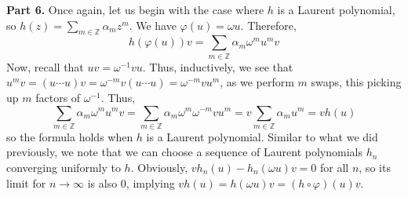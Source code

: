 \documentclass[aps,pra,showpacs,notitlepage,onecolumn,superscriptaddress,nofootinbib]{revtex4-1}
\theoremstyle{definition}
\begin{document}
    \noindent \textbf{Part 6.} Once again, let us begin with the case where $h$ is a Laurent polynomial, so $h(z) = \sum_{m \in \mathbb{Z}} \alpha_m z^{m}$. We have $\varphi(u) = \omega u$. Therefore,
    \begin{equation}
      h(\varphi(u)) v = \displaystyle\sum_{m \in \mathbb{Z}} \alpha_m \omega^m u^{m} v
    \end{equation}
    Now, recall that $uv = \omega^{-1} vu$. Thus, inductively, we see that $u^{m} v = (u \cdots u) v = \omega^{-m} v (u \cdots u) = \omega^{-m} v u^{m}$, as we perform $m$ swaps, this picking up $m$
    factors of $\omega^{-1}$. Thus,
    \begin{equation}
      \displaystyle\sum_{m \in \mathbb{Z}} \alpha_m \omega^m u^{m} v = \displaystyle\sum_{m \in \mathbb{Z}} \alpha_m \omega^m \omega^{-m} v u^{m} = v \displaystyle\sum_{m \in \mathbb{Z}} \alpha_m u^{m} = v h(u)
    \end{equation}
    so the formula holds when $h$ is a Laurent polynomial. Similar to what we did previously, we note that we can choose a sequence of Laurent polynomials $h_n$ converging uniformly to $h$.
    Obviously, $v h_n(u) - h_n (\omega u) v = 0$ for all $n$, so its limit for $n \to \infty$ is also $0$, implying $vh(u) = h(\omega u) v = (h \circ \varphi)(u) v$.
    \newline
\end{document}
